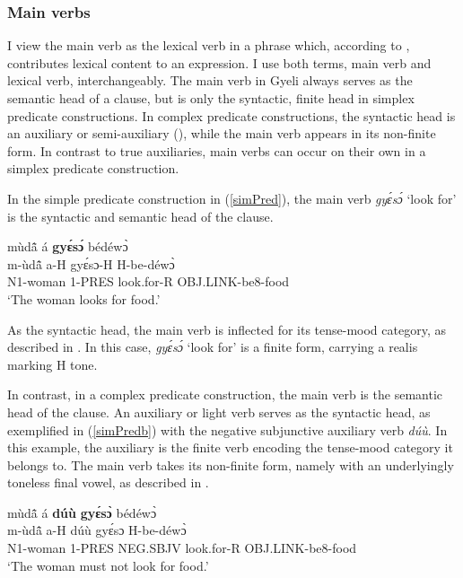 \subsubsection{Main verbs}
\label{sec:MainVerbs}

I view the main verb as the lexical verb in a phrase which, according to \citet[796]{anderson2011a}, contributes lexical content to an expression. I use both terms, main verb and lexical verb, interchangeably.  The main verb in Gyeli always serves as the semantic head of a clause, but is only the syntactic, finite head in simplex predicate constructions. In complex predicate constructions, the syntactic head is an auxiliary or semi-auxiliary (), while the main verb appears in its non-finite form.  In contrast to true auxiliaries, main verbs can occur on their own in a simplex predicate construction. 


In the simple predicate construction in (\ref{simPred}), the main verb {\itshape gyɛ́sɔ́} `look for' is the syntactic and semantic head of the clause.

\begin{exe} 
\ex\label{simPred}
  \glll  mùdã̂ á {\bfseries gyɛ́sɔ́} bédéwɔ̀ \\
        m-ùdã̂ a-H gyɛ́sɔ-H H-be-déwɔ̀  \\
           N1-woman 1-PRES look.for-R OBJ.LINK-be8-food  \\
    \trans `The woman looks for food.'
\end{exe}

\noindent As the syntactic head, the main verb is inflected for its tense-mood category, as described in . In this case, {\itshape gyɛ́sɔ́} `look for' is a finite form, carrying a realis marking H tone.

In contrast, in a complex predicate construction, the main verb is the semantic head of the clause.  An auxiliary or light verb serves as the syntactic head, as exemplified in (\ref{simPredb}) with the negative subjunctive auxiliary verb {\itshape dúù}. In this example, the auxiliary is the finite verb encoding the tense-mood category it belongs to. The main verb takes its non-finite form, namely with an underlyingly toneless final vowel, as described in . 

\begin{exe} 
\ex\label{simPredb}
  \glll  mùdã̂ á {\bfseries dúù} {\bfseries gyɛ́sɔ̀} bédéwɔ̀ \\
        m-ùdã̂ a-H dúù gyɛ́sɔ H-be-déwɔ̀  \\
           N1-woman 1-PRES NEG.SBJV look.for-R OBJ.LINK-be8-food  \\
    \trans `The woman must not look for food.'
\end{exe}

